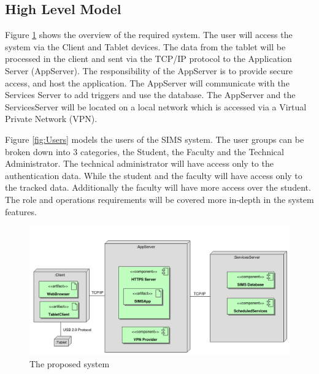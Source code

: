 \documentclass{journal}
\begin{document}
\subsection{High Level Model}

Figure \ref{fig:sysOver} shows the overview of the required system. The user will access the system via the Client and Tablet devices. The data from the tablet will be processed in the client and sent via the TCP/IP protocol to the Application Server (AppServer). The responsibility of the AppServer is to provide secure access, and host the application. The AppServer will communicate with the Services Server to add triggers and use the database. The AppServer and the ServicesServer will be located on a local network which is accessed via a Virtual Private Network (VPN).


Figure \ref{fig:Users} models the users of the SIMS system. The user groups can be broken down into 3 categories, the Student, the Faculty and the Technical Administrator. The technical administrator will have access only to the authentication data. While the student and the faculty will have access only to the tracked data. Additionally the faculty will have more access over the student. The role and operations requirements will be covered more in-depth in the system features.
 
\begin{figure}[!h]
\begin{center}
\includegraphics[width=522px]{diagrams/SystemOverview} \caption{ The proposed system } \label{fig:sysOver}

\end{center}
\end{figure}
\end{document}
